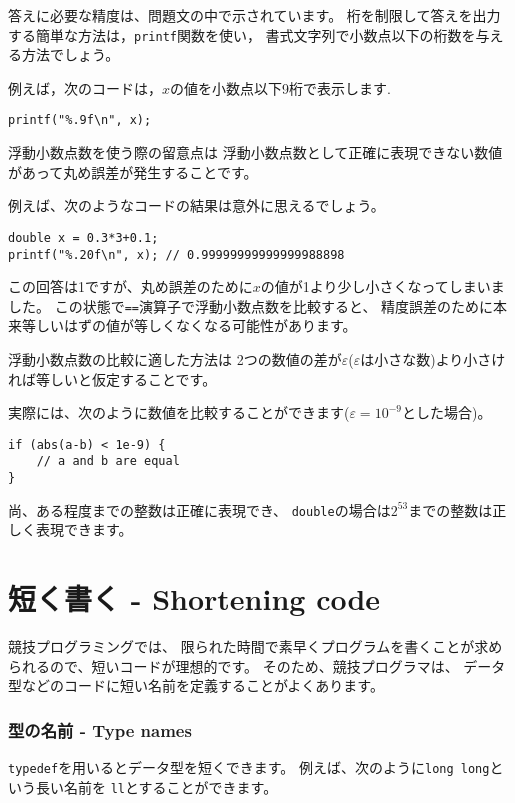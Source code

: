 答えに必要な精度は、問題文の中で示されています。
桁を制限して答えを出力する簡単な方法は，\texttt{printf}関数を使い，
書式文字列で小数点以下の桁数を与える方法でしょう。

例えば，次のコードは，$x$の値を小数点以下9桁で表示します.
\begin{lstlisting}
printf("%.9f\n", x);
\end{lstlisting}

浮動小数点数を使う際の留意点は
浮動小数点数として正確に表現できない数値があって丸め誤差が発生することです。

例えば、次のようなコードの結果は意外に思えるでしょう。
\begin{lstlisting}
double x = 0.3*3+0.1;
printf("%.20f\n", x); // 0.99999999999999988898
\end{lstlisting}

この回答は1ですが、丸め誤差のために$x$の値が1より少し小さくなってしまいました。
この状態で\texttt{==}演算子で浮動小数点数を比較すると、
精度誤差のために本来等しいはずの値が等しくなくなる可能性があります。

浮動小数点数の比較に適した方法は
2つの数値の差が$\varepsilon$($\varepsilon$は小さな数)より小さければ等しいと仮定することです。

実際には、次のように数値を比較することができます($\varepsilon=10^{-9}$とした場合)。
\begin{lstlisting}
if (abs(a-b) < 1e-9) {
    // a and b are equal
}
\end{lstlisting}

尚、ある程度までの整数は正確に表現でき、
\texttt{double}の場合は$2^{53}$までの整数は正しく表現できます。

\section{短く書く - Shortening code}

競技プログラミングでは、
限られた時間で素早くプログラムを書くことが求められるので、短いコードが理想的です。
そのため、競技プログラマは、
データ型などのコードに短い名前を定義することがよくあります。

\subsubsection{型の名前 - Type names}
\texttt{typedef}を用いるとデータ型を短くできます。
例えば、次のように\texttt{long long}という長い名前を
\texttt{ll}とすることができます。

